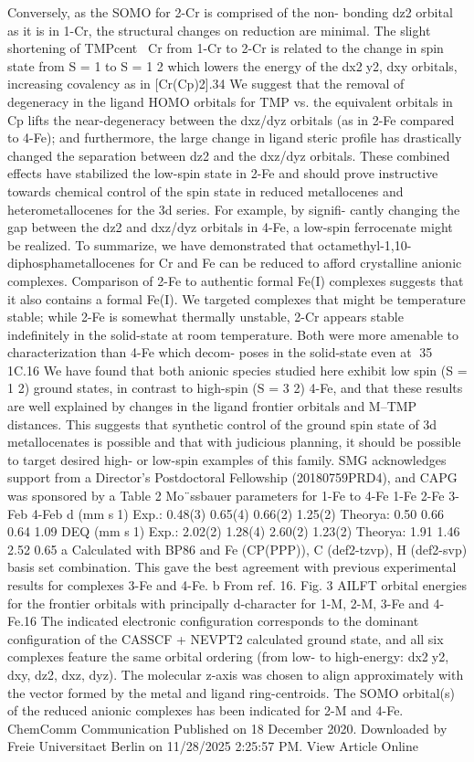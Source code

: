 \documentclass{article}
\begin{document}
Conversely, as the SOMO for 2-Cr is comprised of the non-
bonding dz2 orbital as it is in 1-Cr, the structural changes on
reduction are minimal. The slight shortening of TMPcentCr from
1-Cr to 2-Cr is related to the change in spin state from S = 1 to S = 1
2
which lowers the energy of the dx2y2, dxy orbitals, increasing
covalency as in [Cr(Cp)2].34
We suggest that the removal of degeneracy in the ligand
HOMO orbitals for TMP vs. the equivalent orbitals in Cp lifts
the near-degeneracy between the dxz/dyz orbitals (as in 2-Fe
compared to 4-Fe); and furthermore, the large change in ligand
steric profile has drastically changed the separation between dz2
and the dxz/dyz orbitals. These combined eﬀects have stabilized
the low-spin state in 2-Fe and should prove instructive towards
chemical control of the spin state in reduced metallocenes and
heterometallocenes for the 3d series. For example, by signifi-
cantly changing the gap between the dz2 and dxz/dyz orbitals in
4-Fe, a low-spin ferrocenate might be realized.
To summarize, we have demonstrated that octamethyl-1,10-
diphosphametallocenes for Cr and Fe can be reduced to aﬀord
crystalline anionic complexes. Comparison of 2-Fe to authentic
formal Fe(I) complexes suggests that it also contains a formal
Fe(I). We targeted complexes that might be temperature stable;
while 2-Fe is somewhat thermally unstable, 2-Cr appears stable
indefinitely in the solid-state at room temperature. Both were
more amenable to characterization than 4-Fe which decom-
poses in the solid-state even at 35 1C.16 We have found that
both anionic species studied here exhibit low spin (S = 1
2)
ground states, in contrast to high-spin (S = 3
2) 4-Fe, and that
these results are well explained by changes in the ligand
frontier orbitals and M–TMP distances. This suggests that
synthetic control of the ground spin state of 3d metallocenates
is possible and that with judicious planning, it should be
possible to target desired high- or low-spin examples of this
family.
SMG acknowledges support from a Director’s Postdoctoral
Fellowship (20180759PRD4), and CAPG was sponsored by a
Table 2
Mo¨ssbauer parameters for 1-Fe to 4-Fe
1-Fe
2-Fe
3-Feb
4-Feb
d (mm s1)
Exp.:
0.48(3)
0.65(4)
0.66(2)
1.25(2)
Theorya:
0.50
0.66
0.64
1.09
DEQ (mm s1)
Exp.:
2.02(2)
1.28(4)
2.60(2)
1.23(2)
Theorya:
1.91
1.46
2.52
0.65
a Calculated with BP86 and Fe (CP(PPP)), C (def2-tzvp), H (def2-svp)
basis set combination. This gave the best agreement with previous
experimental results for complexes 3-Fe and 4-Fe. b From ref. 16.
Fig. 3
AILFT orbital energies for the frontier orbitals with principally
d-character for 1-M, 2-M, 3-Fe and 4-Fe.16 The indicated electronic
configuration corresponds to the dominant configuration of the CASSCF +
NEVPT2 calculated ground state, and all six complexes feature the same
orbital ordering (from low- to high-energy: dx2y2, dxy, dz2, dxz, dyz). The
molecular z-axis was chosen to align approximately with the vector formed
by the metal and ligand ring-centroids. The SOMO orbital(s) of the reduced
anionic complexes has been indicated for 2-M and 4-Fe.
ChemComm
Communication
Published on 18 December 2020. Downloaded by Freie Universitaet Berlin on 11/28/2025 2:25:57 PM. 
View Article Online
\end{document}
